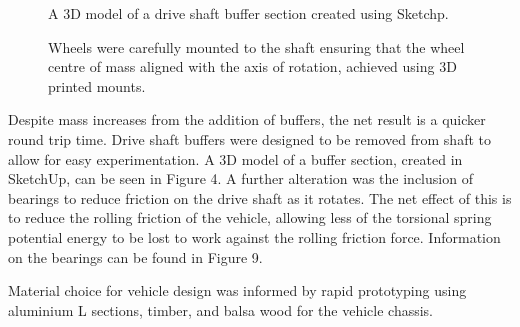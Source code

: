\documentclass[a4paper]{article}
\begin{document}
\begin{figure}[h]
	\centering
	\begin{minipage}[t]{0.45\textwidth}
		\centering
		\caption{A 3D model of a drive shaft buffer section created using Sketchp.}
	\end{minipage}
	\hspace{1cm}
	\begin{minipage}[t]{0.45\textwidth}
		\centering
		\caption{Wheels were carefully mounted to the shaft ensuring that the wheel centre of mass aligned with the axis of rotation, achieved using 3D printed mounts.}
	\end{minipage}
\end{figure}

Despite mass increases from the addition of buffers, the net result is a quicker round trip time. Drive shaft buffers were designed to be removed from shaft to allow for easy experimentation. A 3D model of a buffer section, created in SketchUp, can be seen in Figure 4. A further alteration was the inclusion of bearings to reduce friction on the drive shaft as it rotates. The net effect of this is to reduce the rolling friction of the vehicle, allowing less of the torsional spring potential energy to be lost to work against the rolling friction force. Information on the bearings can be found in Figure 9.

Material choice for vehicle design was informed by rapid prototyping using aluminium L sections, timber, and balsa wood for the vehicle chassis.
\end{document}
